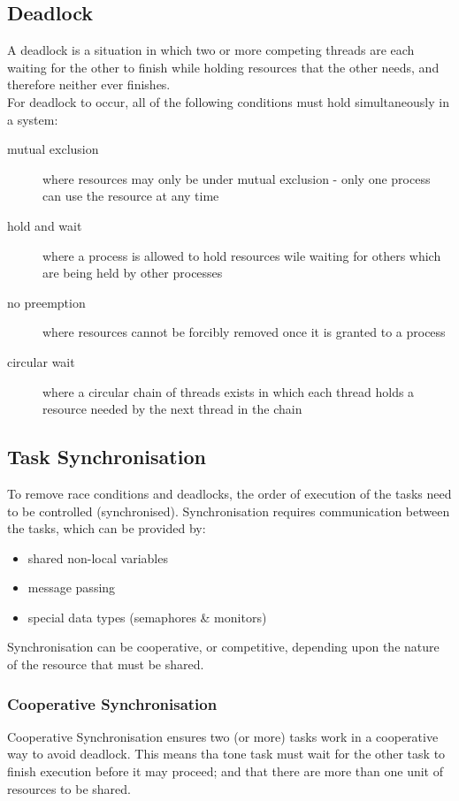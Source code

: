 \subsection{Deadlock}
A deadlock is a situation in which two or more competing threads are each waiting for the other to finish while holding resources that the other needs, and therefore neither ever finishes. \\

For deadlock to occur, all of the following conditions must hold simultaneously in a system:
\begin{description}
    \item[mutual exclusion] where resources may only be under mutual exclusion - only one process can use the resource at any time
    \item[hold and wait] where a process is allowed to hold resources wile waiting for others which are being held by other processes
    \item[no preemption] where resources cannot be forcibly removed once it is granted to a process
    \item[circular wait] where a circular chain of threads exists in which each thread holds a resource needed by the next thread in the chain 
\end{description}

\subsection{Task Synchronisation}
To remove race conditions and deadlocks, the order of execution of the tasks need to be controlled (synchronised). Synchronisation requires communication between the tasks, which can be provided by:
\begin{itemize}
    \item shared non-local variables
    \item message passing
    \item special data types (semaphores \& monitors)
\end{itemize}
Synchronisation can be cooperative, or competitive, depending upon the nature of the resource that must be shared.

\subsubsection{Cooperative Synchronisation}
Cooperative Synchronisation ensures two (or more) tasks work in a cooperative way to avoid deadlock. This means tha tone task must wait for the other task to finish execution before it may proceed; and that there are more than one unit of resources to be shared.\\

